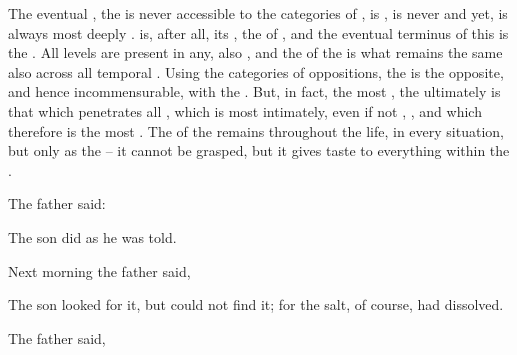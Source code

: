 The eventual , the  is never accessible to the
categories of , is , is never
 and yet, is always most deeply .  is, after
all, its , the  of , and the eventual terminus of
this  is the . All levels are present in any, also
, and the  of the  is what
remains the same also across all temporal .  Using the
categories of  oppositions, the  is the opposite, and
hence incommensurable, with the .  But, in fact, the most
, the ultimately  is that which penetrates all
, which is most intimately, even if not ,
, and which therefore is the most .
The  of the  remains 
throughout the life, in 
every  situation, but only as the  -- 
it cannot be grasped, but it gives taste to everything
within the \hoa. 

\pa
The father said: { 

The son did as he was told. 

Next morning the father 
said, 

The son looked 
for it, but could not find it; for the salt, of course, had 
dissolved. 

The father said, 





}





